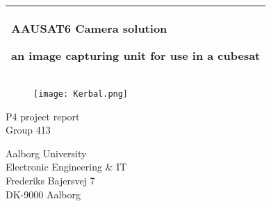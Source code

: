 %
\begin{titlepage}
  \addtolength{\hoffset}{0.5\evensidemargin-0.5\oddsidemargin} %
  \noindent%
  \begin{tabular}{@{}p{\textwidth}@{}}
    \toprule[2pt]
    \midrule
    \vspace{0.2cm}
    \begin{center}
    \Huge{\textbf{
      AAUSAT6 Camera solution %
    }}
    \end{center}
    \begin{center}
      \Large{
      an image capturing unit for use in a cubesat
      }
    \end{center}
    \vspace{0.2cm}\\
    \midrule
    \toprule[2pt]
  \end{tabular}
   \vspace{0.55 cm}
  \begin{figure}[!ht]
\centering
\texttt{[image: Kerbal.png]}
\label{fig:forside}
\end{figure}
  \vspace{-0.35 cm}
  \begin{center}
    {\large
      P4 project report %
    }\\
    \vspace{0.2cm}
    {\Large
      Group 413%
    }
  \end{center}
  \begin{center}
  Aalborg University\\
  Electronic Engineering \& IT\\
  Frederiks Bajersvej 7\\
  DK-9000 Aalborg
  \end{center}
\end{titlepage}

\clearpage